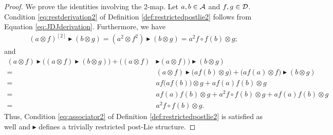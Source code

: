 \documentclass[12pt]{article}
\newcommand {\A}{{\cal{A}}}
\newcommand{\D}{{\cal{D}}}
\newcommand{\btr}{\blacktriangleright}
\begin{document}
      \begin{proof}
        We prove the identities involving the 2-map. Let $a,b\in \A$ and $f,g\in \D$.  Condition \eqref{eq:restderivation2} of Definition \ref{def:restrictedpostlie2} follows from Equation \ref{eq:JDJderivation}. Furthermore, we have
        \begin{align*}
            (a\otimes f)^{[2]}\btr (b\otimes g)=(a^2\otimes f^2)\btr(b\otimes g)=a^2f\circ f(b)\otimes g;
        \end{align*} and
        \begin{align*}
            (a\otimes f)\btr\bigl((a\otimes f)\btr(b\otimes g)\bigl)+\bigl((a\otimes f)&\btr(a\otimes f)\bigl)\btr(b\otimes g)\\
            =~&(a\otimes f)\btr \bigl( af(b)\otimes g \bigl)+\bigl(af(a)\otimes f\bigl)\btr(b\otimes g)\\
            =~&af\bigl(af(b)\bigl)\otimes g+af(a)f(b)\otimes g\\
            =~&af(a)f(b)\otimes g+a^2f\circ f(b)\otimes g+af(a)f(b)\otimes g\\
            =~&a^2f\circ f(b)\otimes g.
        \end{align*} Thus, Condition \eqref{eq:associator2} of Definition \ref{def:restrictedpostlie2} is satisfied as well and $\btr$ defines a trivially restricted post-Lie structure.
 \end{proof}
 
\end{document}
